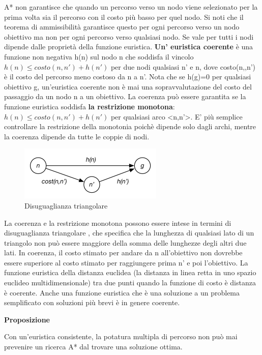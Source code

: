 \documentclass[a4paper]{extarticle}
\begin{document}
A* non garantisce che quando un percorso verso un nodo viene selezionato per la prima volta sia il percorso con il costo più basso per quel nodo. Si noti che il teorema di ammissibilità garantisce questo per ogni percorso verso un nodo obiettivo ma non per ogni percorso verso qualsiasi nodo. Se vale per tutti i nodi dipende dalle proprietà della funzione euristica. \textbf{Un' euristica coerente} è una funzione non negativa h(n) sul nodo n che soddisfa il vincolo $h(n)\leq costo(n,n')+h(n')$ per due nodi qualsiasi n' e n, dove costo(n,,n') è il costo del percorso meno costoso da n a n'. Nota che se h(g)=0 per qualsiasi obiettivo g, un'euristica coerente non è mai una sopravvalutazione del costo del passaggio da un nodo n a un obiettivo. La coerenza può essere garantita se la funzione euristica soddisfa \textbf{la restrizione monotona}: $h(n) \leq costo(n,n')+h(n')$ per qualsiasi arco <n,n'>. E' più semplice controllare la restrizione della monotonia poichè dipende solo dagli archi, mentre la coerenza dipende da tutte le coppie di nodi.
\begin{figure}[h!]
\begin{center}
\includegraphics[scale=0.9]{disuguaglianzaTriangolare.png}
\caption{Disuguaglianza triangolare}
\end{center}
\end{figure}

La coerenza e la restrizione monotona possono essere intese in termini di disuguaglianza triangolare , che specifica che la lunghezza di qualsiasi lato di un triangolo non può essere maggiore della somma delle lunghezze degli altri due lati. In coerenza, il costo stimato per andare da n all'obiettivo non dovrebbe essere superiore al costo stimato per raggiungere prima n' e poi l'obiettivo. La funzione euristica della distanza euclidea (la distanza in linea retta in uno spazio euclideo multidimensionale) tra due punti quando la funzione di costo è distanza è coerente. Anche una funzione euristica che è una soluzione a un problema semplificato con soluzioni più brevi è in genere coerente.

\textbf{Proposizione}
\begin{center}
Con un'euristica consistente, la potatura multipla di percorso non può mai prevenire un ricerca A* dal trovare una soluzione ottima.
\end{center}
\end{document}
